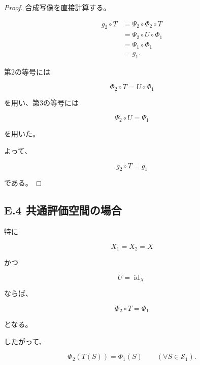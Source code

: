\documentclass[a4paper,11pt]{article}
\newcommand{\Solver}{\mathcal{S}}
\begin{document}
\begin{proof}
合成写像を直接計算する。

\begin{align}
    g_2\circ T
    &=
    \Psi_2\circ\Phi_2\circ T
    \\
    &=
    \Psi_2\circ U\circ\Phi_1
    \\
    &=
    \Psi_1\circ\Phi_1
    \\
    &=
    g_1.
\end{align}

第2の等号には

\begin{equation}
    \Phi_2\circ T
    =
    U\circ\Phi_1
\end{equation}

を用い、第3の等号には

\begin{equation}
    \Psi_2\circ U
    =
    \Psi_1
\end{equation}

を用いた。

よって、

\begin{equation}
    g_2\circ T=g_1
\end{equation}

である。
\end{proof}


\subsection{E.4 共通評価空間の場合}

特に

\begin{equation}
    X_1=X_2=X
\end{equation}

かつ

\begin{equation}
    U=\operatorname{id}_X
\end{equation}

ならば、

\begin{equation}
    \Phi_2\circ T=\Phi_1
\end{equation}

となる。

したがって、

\begin{equation}
    \Phi_2(T(S))
    =
    \Phi_1(S)
    \qquad
    (\forall S\in\Solver_1).
\end{equation}
\end{document}
